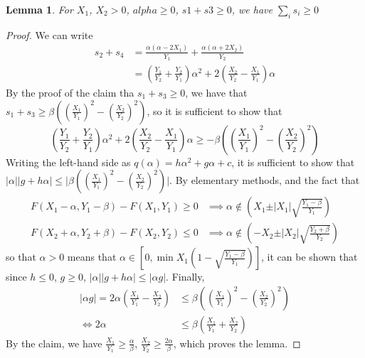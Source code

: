\documentclass{article}
\newtheorem{lemma}{Lemma}
\theoremstyle{case}
\begin{document}
\begin{lemma}
For $X_1$, $X_2 > 0$, $alpha \geq 0$, $s1 + s3 \geq 0$, we have $\sum_i s_i \geq 0$
\end{lemma}
\begin{proof}
We can write
\begin{align*}
s_2 + s_4 & = \frac{\alpha \left( \alpha - 2X_1\right)}{Y_1}  + \frac{\alpha\left( \alpha + 2X_2\right)}{Y_2} \\
& = \left( \frac{Y_1}{Y_2} + \frac{Y_2}{Y_1}\right)\alpha^2 + 2\left( \frac{X_2}{Y_2} - \frac{X_1}{Y_1} \right)\alpha
\end{align*}
By the proof of the claim tha $s_1 + s_3 \geq 0$, we have that $s_1 + s_3 \geq \beta \left( \left( \frac{X_1}{Y_1}\right)^2 - \left( \frac{X_2}{Y_2}\right)^2 \right)$, so it is sufficient to show that
\[
\left( \frac{Y_1}{Y_2} + \frac{Y_2}{Y_1}\right)\alpha^2 + 2\left( \frac{X_2}{Y_2} - \frac{X_1}{Y_1} \right)\alpha \geq  - \beta\left( \left( \frac{X_1}{Y_1}\right)^2 - \left( \frac{X_2}{Y_2}\right)^2 \right)
\]
Writing the left-hand side as $q\left( \alpha \right) = h\alpha^2 + g\alpha + c$, it is sufficient to show that $\vert \alpha\vert \vert g + h \alpha\vert \leq \vert \beta\left( \left( \frac{X_1}{Y_1}\right)^2 - \left( \frac{X_2}{Y_2}\right)^2 \right) \vert$. By elementary methods, and the fact that 
\begin{align*}
F(X_1-\alpha, Y_1-\beta) - F(X_1, Y_1) \geq 0 & \implies \alpha \not \in \left( X_1 \pm \vert X_1\vert \sqrt{\frac{Y_1-\beta}{Y_1}}\right) \\
F(X_2+\alpha, Y_2+\beta) - F(X_2, Y_2) \leq 0 & \implies \alpha \not \in \left( -X_2 \pm \vert X_2\vert \sqrt{\frac{Y_2 +\beta}{Y_2}} \right)
\end{align*}
so that $\alpha > 0$ means that $\alpha \in \left[ 0, \min{X_1\left( 1 - \sqrt{\frac{Y_1-\beta}{Y_1}}\right)}\right]$, it can be shown that since $h \leq 0$, $g \geq 0$, $\vert \alpha\vert \vert g + h \alpha\vert \leq \vert \alpha g \vert$. Finally,
\begin{align*}
\vert \alpha g \vert = 2\alpha\left( \frac{X_1}{Y_1} - \frac{X_2}{Y_2}\right) & \leq \beta\left( \left(\frac{X_1}{Y_1}\right)^2 - \left(\frac{X_2}{Y_2}\right)^2\right) \\
\iff 2\alpha & \leq \beta\left( \frac{X_1}{Y_1} + \frac{X_2}{Y_2}\right)
\end{align*}
By the claim, we have $\frac{X_1}{Y_1} \geq \frac{\alpha}{\beta}$, $\frac{X_2}{Y_2} \geq \frac{2\alpha}{\beta}$, which proves the lemma.

\end{proof}
\end{document}
